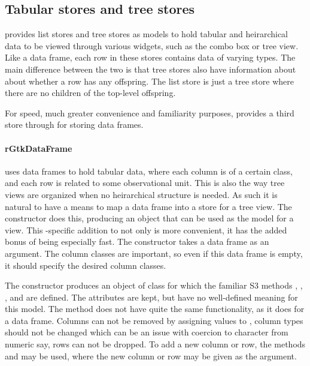 \subsection{Tabular  stores and tree stores}
\label{sec:tabular-stores-tree}

\GTK\/ provides list stores and tree stores as models to hold tabular and
heirarchical data to be viewed through various widgets, such as the
combo box or tree view. Like a data frame, each row in these stores
contains data of varying types. The main difference between the two is
that tree stores also have information about about whether a row has
any offspring. The list store is just a tree store where there
are no children of the top-level offspring.

For speed, much greater convenience and familiarity purposes,  provides a third store
through  for storing data frames.

\paragraph{rGtkDataFrame}

\R\/ uses data frames to hold tabular data, where each column is of a
certain class, and each row is related to some observational
unit. This is also the way tree views are organized when no
heirarchical structure is needed. As such it is natural to have a
means to map a data frame into a store for a tree view. The
 constructor does this, producing an object
that can be used as the model for a view. This \R-specific
addition to \GTK\/ not only is more convenient, it has the added bonus
of being especially fast. The constructor takes a data frame as an
argument. The column classes are important, so even if this data frame
is empty, it should specify the desired column classes.

The constructor produces an object of class 
for which the familiar S3 methods
\method{[}{RGtkDataFrame}, \method{[\ASSIGN}{RGtkDataFrame},
, and 
are defined. The  attributes are kept, but have no
well-defined meaning
for this model. The \code{[$<$-} method does not have quite the same
functionality, as it does for a data frame. Columns can not be removed
by assigning values to , column types
should not be changed which can be an issue with coercion to character from numeric
say, rows can not be dropped. To add a new column or row, the methods
 and
 may be used, where the new column
or row may be given as the argument.

